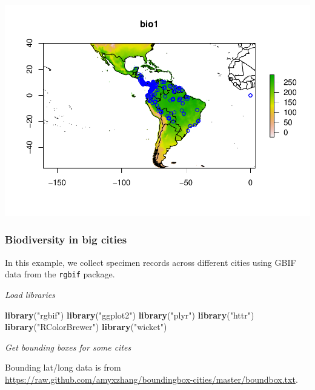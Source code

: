 \documentclass[author-year, review, 11pt]{components/elsarticle} %
\makeatletter
\newenvironment{Shaded}{\begin{snugshade}}{\end{snugshade}}
\newcommand{\KeywordTok}[1]{\textcolor[rgb]{0.13,0.29,0.53}{\textbf{#1}}}
\newcommand{\StringTok}[1]{\textcolor[rgb]{0.31,0.60,0.02}{#1}}
\newcommand{\NormalTok}[1]{#1}
\def\maxwidth{\ifdim\Gin@nat@width>\linewidth\linewidth
\else\Gin@nat@width\fi}
\let\Oldincludegraphics\includegraphics
\renewcommand{\includegraphics}[1]{\Oldincludegraphics[width=\maxwidth]{#1}}
\makeatother
\begin{document}
\includegraphics{components/figure/manuscript-unnamed-chunk-53-1.pdf}

\subsubsection{Biodiversity in big
cities}\label{biodiversity-in-big-cities}

In this example, we collect specimen records across different cities
using GBIF data from the \texttt{rgbif} package.

\emph{Load libraries}

\begin{Shaded}
\begin{Highlighting}[]
\KeywordTok{library}\NormalTok{(}\StringTok{"rgbif"}\NormalTok{)}
\KeywordTok{library}\NormalTok{(}\StringTok{"ggplot2"}\NormalTok{)}
\KeywordTok{library}\NormalTok{(}\StringTok{"plyr"}\NormalTok{)}
\KeywordTok{library}\NormalTok{(}\StringTok{"httr"}\NormalTok{)}
\KeywordTok{library}\NormalTok{(}\StringTok{"RColorBrewer"}\NormalTok{)}
\KeywordTok{library}\NormalTok{(}\StringTok{"wicket"}\NormalTok{)}
\end{Highlighting}
\end{Shaded}

\emph{Get bounding boxes for some cites}

Bounding lat/long data is from
\url{https://raw.github.com/amyxzhang/boundingbox-cities/master/boundbox.txt}.
\end{document}
